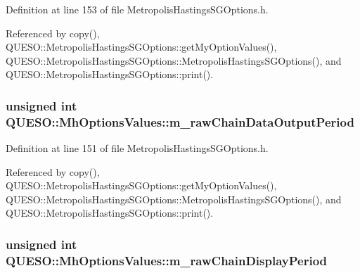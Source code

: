 Definition at line 153 of file Metropolis\-Hastings\-S\-G\-Options.\-h.



Referenced by copy(), Q\-U\-E\-S\-O\-::\-Metropolis\-Hastings\-S\-G\-Options\-::get\-My\-Option\-Values(), Q\-U\-E\-S\-O\-::\-Metropolis\-Hastings\-S\-G\-Options\-::\-Metropolis\-Hastings\-S\-G\-Options(), and Q\-U\-E\-S\-O\-::\-Metropolis\-Hastings\-S\-G\-Options\-::print().

\hypertarget{class_q_u_e_s_o_1_1_mh_options_values_ad838a3095d5158e27b9af55597822d31}{
\subsubsection[{m\-\_\-raw\-Chain\-Data\-Output\-Period}]{\setlength{\rightskip}{0pt plus 5cm}unsigned int Q\-U\-E\-S\-O\-::\-Mh\-Options\-Values\-::m\-\_\-raw\-Chain\-Data\-Output\-Period}}\label{class_q_u_e_s_o_1_1_mh_options_values_ad838a3095d5158e27b9af55597822d31}


Definition at line 151 of file Metropolis\-Hastings\-S\-G\-Options.\-h.



Referenced by copy(), Q\-U\-E\-S\-O\-::\-Metropolis\-Hastings\-S\-G\-Options\-::get\-My\-Option\-Values(), Q\-U\-E\-S\-O\-::\-Metropolis\-Hastings\-S\-G\-Options\-::\-Metropolis\-Hastings\-S\-G\-Options(), and Q\-U\-E\-S\-O\-::\-Metropolis\-Hastings\-S\-G\-Options\-::print().

\hypertarget{class_q_u_e_s_o_1_1_mh_options_values_a6d11f0ea62107b789da99befe29ebffa}{
\subsubsection[{m\-\_\-raw\-Chain\-Display\-Period}]{\setlength{\rightskip}{0pt plus 5cm}unsigned int Q\-U\-E\-S\-O\-::\-Mh\-Options\-Values\-::m\-\_\-raw\-Chain\-Display\-Period}}\label{class_q_u_e_s_o_1_1_mh_options_values_a6d11f0ea62107b789da99befe29ebffa}


